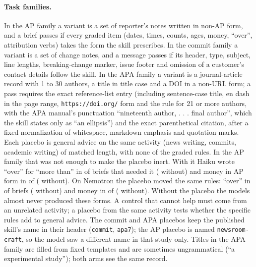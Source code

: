 \paragraph{Task families.} In the AP family a variant is a set of reporter's notes written in non-AP form, and a brief passes if every graded item (dates, times, counts, ages, money, ``over'', attribution verbs) takes the form the skill prescribes. In the commit family a variant is a set of change notes, and a message passes if its header, type, subject, line lengths, breaking-change marker, issue footer and omission of a customer's contact details follow the skill. In the APA family a variant is a journal-article record with 1 to 30 authors, a title in title case and a DOI in a non-URL form; a pass requires the exact reference-list entry (including sentence-case title, en dash in the page range, \texttt{https://doi.org/} form and the rule for 21 or more authors, with the APA manual's punctuation ``nineteenth author, . . . final author'', which the skill states only as ``an ellipsis'') and the exact parenthetical citation, after a fixed normalization of whitespace, markdown emphasis and quotation marks. Each placebo is general advice on the same activity (news writing, commits, academic writing) of matched length, with none of the graded rules. In the AP family that was not enough to make the placebo inert. With it Haiku wrote ``over'' for ``more than'' in \NLsFourBPlacOverWith{} of \NLsFourBPlacOverN{} briefs that needed it (\NLsFourBPlacOverWithout{} without) and money in AP form in \NLsFourBPlacMoneyWith{} of \NLsFourBPlacMoneyN{} (\NLsFourBPlacMoneyWithout{} without). On Nemotron the placebo moved the same rules: ``over'' in \NLnFourBPlacOverWith{} of \NLnFourBPlacOverN{} briefs (\NLnFourBPlacOverWithout{} without) and money in \NLnFourBPlacMoneyWith{} of \NLnFourBPlacMoneyN{} (\NLnFourBPlacMoneyWithout{} without). Without the placebo the models almost never produced these forms. A control that cannot help must come from an unrelated activity; a placebo from the same activity tests whether the specific rules add to general advice. The commit and APA placebos keep the published skill's name in their header (\texttt{commit}, \texttt{apa7}); the AP placebo is named \texttt{newsroom-craft}, so the model saw a different name in that study only. Titles in the APA family are filled from fixed templates and are sometimes ungrammatical (``a experimental study''); both arms see the same record.

